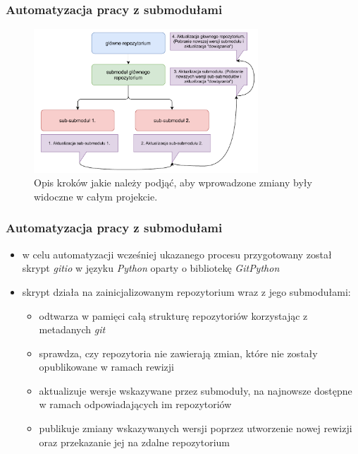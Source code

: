 \documentclass[10pt]{beamer}
\begin{document}
\begin{frame}
\frametitle{Automatyzacja pracy z submodułami}
\begin{figure}
    \includegraphics[width=0.75\textwidth]{static/submodules_update}
    \caption{Opis kroków jakie należy podjąć, aby wprowadzone zmiany były widoczne w całym projekcie.}
\end{figure}
\end{frame}

\begin{frame}
    \frametitle{Automatyzacja pracy z submodułami}
    \begin{itemize}
        \item w celu automatyzacji wcześniej ukazanego procesu przygotowany został skrypt \emph{gitio} w języku \emph{Python} oparty o bibliotekę \emph{GitPython}
        \item skrypt działa na zainicjalizowanym repozytorium wraz z jego submodułami:
        \begin{itemize}
            \item odtwarza w pamięci całą strukturę repozytoriów korzystając z metadanych \emph{git}
            \item sprawdza, czy repozytoria nie zawierają zmian, które nie zostały opublikowane w ramach rewizji
            \item aktualizuje wersje wskazywane przez submoduły, na najnowsze dostępne w ramach odpowiadających im repozytoriów
            \item publikuje zmiany wskazywanych wersji poprzez utworzenie nowej rewizji oraz przekazanie jej na zdalne repozytorium
        \end{itemize}
    \end{itemize}
\end{frame}
\end{document}
